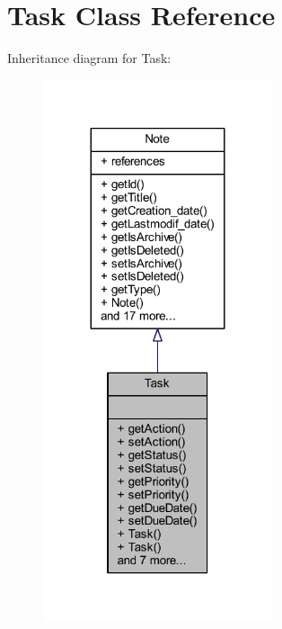 \hypertarget{class_task}{}\section{Task Class Reference}
\label{class_task}


Inheritance diagram for Task\+:\nopagebreak
\begin{figure}[H]
\begin{center}
\leavevmode
\includegraphics[width=191pt]{class_task__inherit__graph}
\end{center}
\end{figure}



